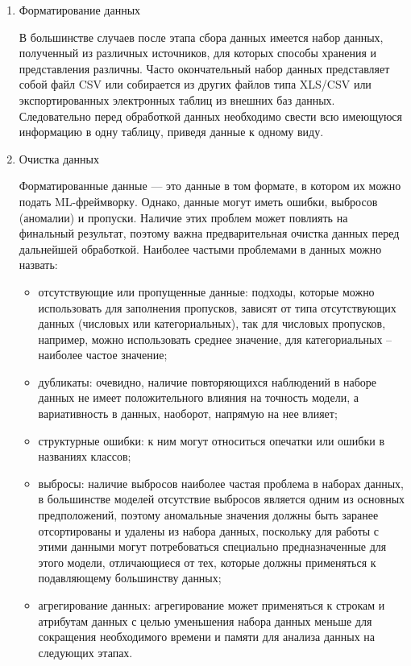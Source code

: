 \documentclass[12pt,a4paper, oneside]{extreport}
\begin{document}
\begin{enumerate}
	\item  Форматирование данных

В большинстве случаев после этапа сбора данных имеется набор данных, полученный  из различных источников, для которых  способы  хранения и представления различны. Часто окончательный набор данных представляет собой файл CSV или собирается из других файлов типа XLS/CSV или экспортированных электронных таблиц из внешних баз данных. Следовательно перед обработкой данных необходимо свести всю имеющуюся информацию в одну таблицу, приведя данные к одному виду.

\item  Очистка данных

Форматированные данные — это данные в том формате, в котором их можно подать ML-фреймворку. Однако, данные могут иметь ошибки,  выбросов (аномалии) и пропуски. Наличие этих проблем может повлиять на финальный результат, поэтому важна предварительная очистка данных перед дальнейшей обработкой. 
Наиболее частыми проблемами в данных можно назвать: 

\begin{itemize}
	\item отсутствующие или пропущенные данные: подходы, которые можно использовать для заполнения пропусков, зависят от типа отсутствующих данных (числовых или категориальных), так для числовых пропусков, например, можно использовать среднее значение, для категориальных – наиболее частое значение;
	\item дубликаты: очевидно, наличие повторяющихся наблюдений в наборе данных не имеет положительного влияния на точность  модели, а вариативность в данных, наоборот, напрямую на нее влияет;
	\item  структурные ошибки: к ним могут относиться опечатки или  ошибки в названиях классов;
	\item выбросы: наличие выбросов наиболее частая проблема в наборах данных, в большинстве моделей отсутствие выбросов  является одним из основных предположений, поэтому аномальные значения должны быть заранее отсортированы и удалены из набора данных, поскольку для работы с этими данными могут потребоваться  специально предназначенные для этого модели, отличающиеся от тех, которые должны применяться к подавляющему большинству данных;
	\item  агрегирование данных:  агрегирование может применяться к строкам и атрибутам данных с целью уменьшения набора  данных меньше для сокращения необходимого  времени и памяти для анализа данных на следующих этапах.
\end{itemize}


\end{enumerate}
\end{document}
